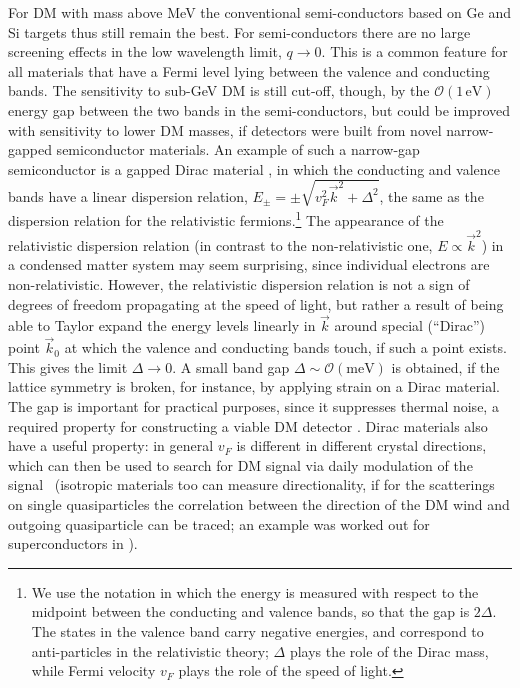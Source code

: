 For DM with mass above MeV the conventional semi-conductors based on Ge and Si targets thus still remain the best. For semi-conductors there are no large screening effects in the low wavelength limit, $q\to0$. This is a common feature for all materials that have a Fermi level lying between the valence and conducting bands. The sensitivity to sub-GeV DM is still cut-off, though, by the ${\mathcal O}(1\,\text{eV})$ energy gap between the two bands in the semi-conductors, but could be improved with sensitivity to lower DM masses, if detectors were built from novel narrow-gapped semiconductor materials.
 An example of such a narrow-gap semiconductor is a gapped Dirac material \cite{Vafek_2014}, in which the  conducting and valence bands have a linear dispersion relation, $E_\pm=\pm\sqrt{v_F^2 \vec k^2+\Delta^2}$, the same as the dispersion relation for the relativistic fermions.\footnote{We use the notation in which the energy is measured with respect to the midpoint between the conducting and valence bands, so that the gap is $2\Delta$. The states in the valence band carry negative energies, and correspond to anti-particles in the relativistic theory; $\Delta$ plays the role of the Dirac mass, while Fermi velocity $v_F$ plays the role of the speed of light.} The appearance of the relativistic dispersion relation (in contrast to the non-relativistic one, $E\propto \vec k^2$) in a condensed matter system may seem surprising, since individual electrons are non-relativistic. However, the relativistic dispersion relation  is not a sign of degrees of freedom propagating at the speed of light, but rather a result of being able to Taylor expand 
 the energy levels linearly  in $\vec k$ around special (``Dirac'') point $\vec k_0$ at which the valence and conducting bands touch, if such a point exists. This gives the limit $\Delta \to0$. A small band gap $\Delta \sim {\mathcal O}(\text{meV})$ is obtained, if the lattice symmetry is broken, for instance, by applying strain on a Dirac material. 
The gap is important for practical purposes, since it suppresses thermal noise, a required property for constructing a viable DM detector \cite{DM:electron:Dirac:material}.  Dirac materials also have a useful property: in general $v_F$ is different in different crystal directions, which can then be used to search for DM signal via daily modulation of the signal~\cite{DM:Dirac:amt:directional} (isotropic materials too can measure directionality, if for the scatterings on single quasiparticles the correlation between the direction of the DM wind and outgoing quasiparticle can be traced; an example was worked out for superconductors in \cite{DM:supercon:directional}).  


